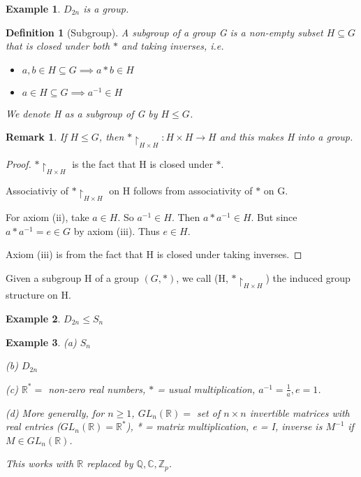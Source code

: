 \documentclass[11pt, oneside]{book}
\theoremstyle{break}
\newtheorem*{proof}{Proof}
\newtheorem*{remark}{Remark}
\newtheorem{defn}{Definition}[section]
\newtheorem{eg}{Example}[section]
\newcommand{\bb}[1]{\mathbb{#1}}			%
\begin{document}
\begin{eg}
    $D_{2n}$ is a group.
\end{eg}

\begin{defn}[Subgroup]
    A subgroup of a group G is a non-empty subset $H \subseteq G$ that is closed under both $*$ and taking inverses, i.e.
    \begin{itemize}
        \item $a, b \in H \subseteq G \implies a * b \in H$
        \item $a \in H \subseteq G \implies a^{-1} \in H$
    \end{itemize}

    We denote H as a subgroup of G by $H \leq G$.
\end{defn}

\begin{remark}
    If $H \leq G$, then $*\restriction_{H \times H} : H \times H \to H$ and this makes H into a group.
\end{remark}

\begin{proof}
    $* \restriction_{H \times H}$
    is the fact that H is closed under $*$.

    Associativiy of $* \restriction_{H \times H}$ on H follows from associativity of $*$ on G.

    For axiom (ii), take $a \in H$. So $a^{-1} \in H$. Then $a * a^{-1} \in H$. But since $a * a^{-1} = e \in G$ by axiom (iii). Thus $e \in H$.

    Axiom (iii) is from the fact that H is closed under taking inverses.
\end{proof}

Given a subgroup H of a group $(G, *)$, we call (H, $*\restriction_{H \times H}$) the induced group structure on H.

\begin{eg}
    $D_{2n} \leq S_n$
\end{eg}

\begin{eg}
    (a) $S_n$

    (b) $D_{2n}$

    (c) $\bb{R}^* = $ non-zero real numbers, $*$ = usual multiplication, $a^{-1} = \frac{1}{a}, e = 1$.

    (d) More generally, for $n \geq 1$, $GL_n (\bb{R}) =$ set of $n \times n$ invertible matrices with real entries ($GL_n (\bb{R}) = \bb{R}^*$), * = matrix multiplication, e = I, inverse is $M^{-1}$ if $M \in GL_n (\bb{R})$.

    This works with $\bb{R}$ replaced by $\bb{Q}, \bb{C}, \bb{Z}_p$.
\end{eg}
\end{document}
